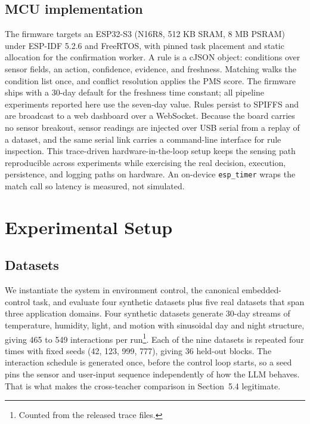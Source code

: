 \documentclass[11pt,a4paper]{article}
\begin{document}
\subsection{MCU implementation}

The firmware targets an ESP32-S3 (N16R8, 512 KB SRAM, 8 MB PSRAM) under
ESP-IDF 5.2.6 and FreeRTOS, with pinned task placement and static allocation
for the confirmation worker. A rule is a cJSON object:
conditions over sensor fields, an action, confidence, evidence, and
freshness. Matching walks the condition list once, and conflict resolution
applies the PMS score. The firmware ships with a 30-day default for the
freshness time constant; all pipeline experiments reported here use the
seven-day value. Rules persist to SPIFFS and are broadcast to a web dashboard
over a WebSocket. Because the board carries no sensor breakout,
sensor readings are injected over USB serial from a replay of a dataset, and
the same serial link carries a command-line interface for rule inspection.
This trace-driven hardware-in-the-loop setup keeps the sensing path
reproducible across experiments while exercising the real decision,
execution, persistence, and logging paths on hardware. An on-device
\texttt{esp\_timer} wraps the match call so latency is measured, not
simulated.

\section{Experimental Setup}

\subsection{Datasets}

We instantiate the system in environment control, the canonical
embedded-control task, and evaluate four synthetic datasets plus five real
datasets that span three application domains. Four synthetic datasets
generate 30-day streams of temperature, humidity, light, and motion with
sinusoidal day and night structure, giving 465 to 549 interactions per
run\footnote{Counted from the released trace files.}.
Each of the nine datasets is repeated four times with fixed seeds (42, 123,
999, 777), giving 36 held-out blocks. The interaction schedule is generated
once, before the control loop starts, so a seed pins the sensor and
user-input sequence independently of how the LLM behaves. That is what makes
the cross-teacher comparison in Section~5.4 legitimate.
\end{document}
